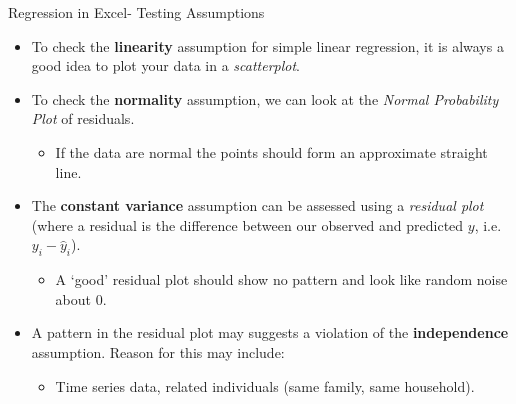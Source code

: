 \documentclass[xcolor=svgnames, handout]{beamer}
\begin{document}
\begin{frame}[label=current]{Regression in Excel- Testing Assumptions}
\begin{itemize}
\item To check the {\bf linearity} assumption for simple linear regression, it is always a good idea to plot your data in a \textit{scatterplot}.
\medskip
\item To check the {\bf normality} assumption, we can look at the \textit{Normal Probability Plot} of residuals. 
\begin{itemize}
\item If the data are normal the points should form an approximate straight line. 
\end{itemize}

\medskip
\item The {\bf constant variance} assumption can be assessed using a \textit{residual plot} (where a residual  is the difference between our observed and predicted $y$, i.e. $y_i - \hat y_i$).
\begin{itemize}
\item A `good' residual plot should show no pattern and look like random noise about 0.
\end{itemize}
\medskip
\item A pattern in the residual plot may suggests a violation of the {\bf independence} assumption.  Reason for this may include:
\begin{itemize}
\item Time series data,  related individuals (same family, same household).
\end{itemize}


\medskip
\end{itemize}
\end{frame}
\end{document}
